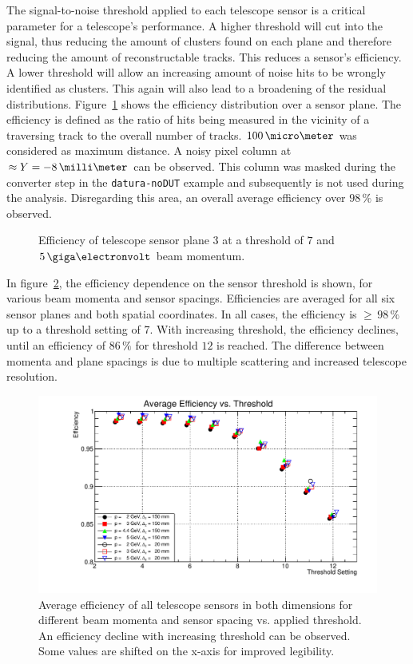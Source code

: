 The signal-to-noise threshold applied to each telescope sensor is a critical
parameter for a telescope's performance. A higher threshold will cut into the
signal, thus reducing the amount of clusters found on each plane and therefore
reducing the amount of reconstructable tracks. This reduces a sensor's
efficiency. A lower threshold will allow an increasing amount of noise hits to
be wrongly identified as clusters. This again will also lead to a broadening of
the residual distributions. Figure~\ref{fig:effi} shows the efficiency
distribution over a sensor plane. The efficiency is defined as the ratio of hits
being measured in the vicinity of a traversing track to the overall number of
tracks. $100\,\micro\meter$ was considered as maximum distance. A noisy pixel
column at $\approx Y = -8\,\milli\meter$ can be observed. This column was masked
during the converter step in the \texttt{datura-noDUT} example and subsequently
is not used during the analysis. Disregarding this area, an overall average
efficiency over $98\,\%$ is observed.

\begin{figure}[hbtp]
\centering
\caption[Telescope sensor efficiency]{Efficiency of telescope sensor plane $3$
at a threshold of $7$ and $5\,\giga\electronvolt$ beam momentum.}
\label{fig:effi}
\end{figure}

In figure~\ref{fig:effi_thresh}, the efficiency dependence on the sensor
threshold is shown, for various beam momenta and sensor spacings. Efficiencies
are averaged for all six sensor planes and both spatial coordinates. In all
cases, the efficiency is $\ge\,98\,\%$ up to a threshold setting of 7. With
increasing threshold, the efficiency declines, until an efficiency of $86\,\%$
for threshold $12$ is reached. The difference between momenta and plane spacings
is due to multiple scattering and increased telescope resolution.

\begin{figure}[hbtp]
\centering
\includegraphics[width=\textwidth]{figures/effi_thresh.pdf}
\caption[Overall telescope sensor efficiency vs. threshold for different beam
momenta and sensor spacings]{Average efficiency of all telescope sensors in both
dimensions for different beam momenta and sensor spacing vs. applied threshold.
An efficiency decline with increasing threshold can be observed. Some values are
shifted on the x-axis for improved legibility.}
\label{fig:effi_thresh}
\end{figure}

